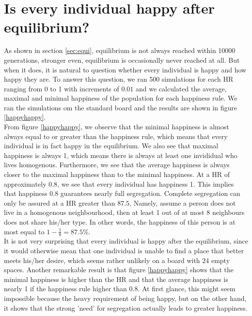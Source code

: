 
\section{Is every individual happy after equilibrium?} 
\label{sec:meanhappy}
As shown in section \ref{sec:equi}, equilibrium is not always reached within 10000 generations, stronger even, equilibrium is occasionally never reached at all.
But when it does, it is natural to question whether every individual is happy and how happy they are. 
To answer this question, we ran 500 simulations for each HR ranging from 0 to 1 with increments of $0.01$ and we calculated the average, maximal and minimal happiness of the population for each happiness rule. 
We ran the simulations om the standard board and the results are shown in figure \ref{happyhappy}.\\

From figure \ref{happyhappy}, we observe that the minimal happiness is almost always equal to or greater than the happiness rule, which means that every individual is in fact happy  in the equilibrium. 
We also see that maximal happiness is always 1, which means there is always at least one invididual who lives homogenous. 
Furthermore, we see that the average happiness is always closer to the maximal happiness than to the minimal happiness. At a HR of approximately $0.8$, we see that every individual has happiness 1. 
This implies that happiness $0.8$ guarantees nearly full segregation. Complete segregation can only be assured at a HR greater than $87.5$, Namely, assume a person does not live in a homogenous neighbourhood, then at least 1 out of at most 8 neighbours does not share his/her type. In other words, the happiness of this person is at most equal to \(1-\frac{1}{8}=87.5\%\).\\

It is not very surprising that every individual is happy after the equilibrium, since it would otherwise mean that one individual is unable to find a place that better meets his/her desire, which seems rather unlikely on a board with $24$ empty spaces. 
Another remarkable result is that figure \ref{happyhappy} shows that the minimal happiness is higher than the HR and that the average happiness is nearly 1 if the happiness rule higher than $0.8$. 
At first glance, this might seem impossible because the heavy requirement of being happy, but on the other hand, it shows that the strong 'need' for segregation actually leads to greater happiness.

